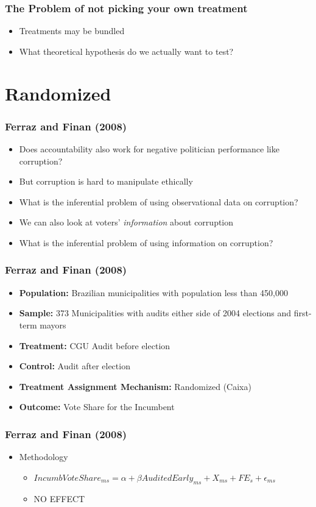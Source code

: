 \documentclass[xcolor=x11names,compress]{beamer}\usepackage[]{graphicx}\usepackage[]{color}
\renewcommand{\(}{\begin{columns}}
\renewcommand{\)}{\end{columns}}
\newcommand{\<}[1]{\begin{column}{#1}}
\renewcommand{\>}{\end{column}}
\begin{document}
\begin{frame}
\frametitle{The Problem of not picking your own treatment}
\begin{itemize}
\item Treatments may be bundled
\pause
\item What theoretical hypothesis do we actually want to test?
\end{itemize}
\end{frame}


\section{Randomized}

\begin{frame}
\frametitle{Ferraz and Finan (2008)}
\begin{itemize}
\item Does accountability also work for negative politician performance like corruption?
\pause
\item But corruption is hard to manipulate ethically
\pause
\item What is the inferential problem of using observational data on corruption?
\pause
\item We can also look at voters' \textit{information} about corruption 
\pause
\item What is the inferential problem of using information on corruption?
\end{itemize}
\end{frame}

\begin{frame}
\frametitle{Ferraz and Finan (2008)}
\begin{itemize}
\item \textbf{Population:} Brazilian municipalities with population less than 450,000
\item \textbf{Sample:} 373 Municipalities with audits either side of 2004 elections and first-term mayors
\item \textbf{Treatment:} CGU Audit before election
\item \textbf{Control:} Audit after election
\item \textbf{Treatment Assignment Mechanism:} Randomized (Caixa)
\item \textbf{Outcome:} Vote Share for the Incumbent
\end{itemize}
\end{frame}

\begin{frame}
\frametitle{Ferraz and Finan (2008)}
\begin{itemize}
\item Methodology
\begin{itemize}
\item $IncumbVoteShare_{ms} = \alpha + \beta AuditedEarly_{ms} + X_{ms} + FE_{s} + \epsilon_{ms}$
\pause
\item NO EFFECT
\end{itemize}
\end{itemize}
\end{frame}
\end{document}

